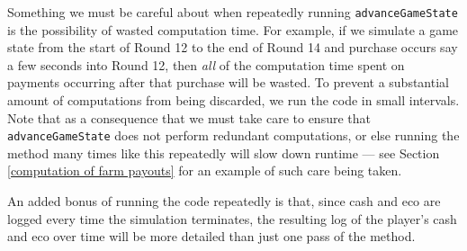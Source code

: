 \documentclass[12pt,letterpaper]{article}
\theoremstyle{remark}
\theoremstyle{plain}
\begin{document}
Something we must be careful about when repeatedly running \texttt{advanceGameState} is the possibility of wasted computation time. For example, if we simulate a game state from the start of Round 12 to the end of Round 14 and purchase occurs say a few seconds into Round 12, then \textit{all} of the computation time spent on payments occurring after that purchase will be wasted. To prevent a substantial amount of computations from being discarded, we run the code in small intervals. Note that as a consequence that we must take care to ensure that \texttt{advanceGameState} does not perform redundant computations, or else running the method many times like this repeatedly will slow down runtime --- see Section \ref{computation of farm payouts} for an example of such care being taken.

An added bonus of running the code repeatedly is that, since cash and eco are logged every time the simulation terminates, the resulting log of the player's cash and eco over time will be more detailed than just one pass of the method.
\end{document}
